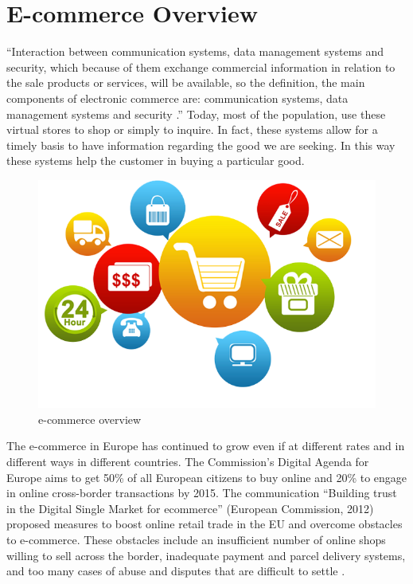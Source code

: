 \section{E-commerce Overview}
\label{sec:e_commerce_overview}
“Interaction between communication systems, data management systems and security, which because of them exchange commercial information in relation to the sale products or services, will be available, so the definition, the main components of electronic commerce are: communication systems, data management systems and security \cite{commerce_intro_1}.”
\newline
Today, most of the population, use these virtual stores to shop or simply to inquire. In fact, these systems allow for a timely basis to have information regarding the good we are seeking. In this way these systems help the customer in buying a particular good.
\newline
\begin{figure}[htb]
 \centering
 \includegraphics[width=0.8\linewidth]{images/chapter1/e-commerce.png}\hfill
 \caption[e-commerce overview]{e-commerce overview}
 \label{fig:e_commerce_overview}
\end{figure}
The e-commerce in Europe has continued to grow even if at different rates and in different ways in different countries.
The Commission's Digital Agenda for Europe aims to get 50\% of all European citizens to buy online and 20\% to engage in online cross-border transactions by 2015. The communication “Building trust in the Digital Single Market for ecommerce” (European Commission, 2012) proposed measures to boost online retail trade in the EU and overcome obstacles to e-commerce. These obstacles include an insufficient number of online shops willing to sell across the border, inadequate payment and parcel delivery systems, and too many cases of abuse and disputes that are difficult to settle \cite{e_commerce_eu}.
